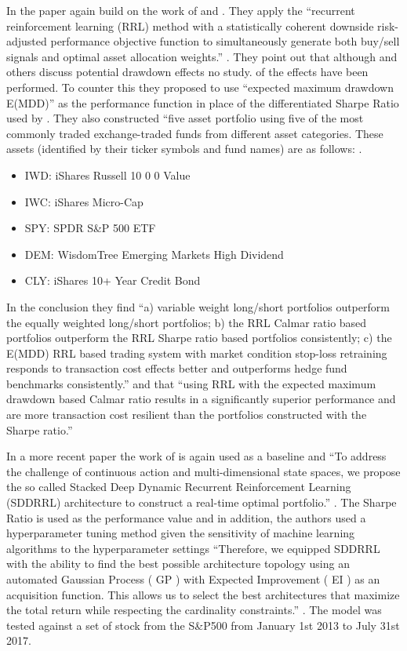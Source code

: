 \documentclass[oneside,12pt]{Classes/RoboticsLaTeX}
\begin{document}
\begin{itemize}
In the paper \citet{ALMAHDI2017267} again build on the work of \citet{MoodyJohn1998Pfar} and \citet{MoodyJ2001Lttv}. They apply the “recurrent reinforcement learning (RRL) method with a statistically coherent downside risk-adjusted performance objective function to simultaneously generate both buy/sell signals and optimal asset allocation weights.” \citep[p267]{ALMAHDI2017267}. They point out that although \citet{MoodyJohn1998Pfar} and others discuss potential drawdown effects no study. of the effects have been performed. To counter this they proposed to use “expected maximum drawdown E(MDD)” \citep[p267]{ALMAHDI2017267} as the performance function in place of the differentiated Sharpe Ratio used by \citet{MoodyJohn1998Pfar}.  They also constructed “five asset portfolio using five of the most commonly traded exchange-traded funds from different asset categories. These assets (identified by their ticker symbols and fund names) are as follows: \citep[p271]{ALMAHDI2017267}.
\begin{itemize}
\item IWD: iShares Russell 10 0 0 Value 
\item IWC: iShares Micro-Cap 
\item SPY: SPDR S&P 500 ETF 
\item DEM: WisdomTree Emerging Markets High Dividend 
\item CLY: iShares 10+ Year Credit Bond
\end{itemize}

 In the conclusion they find “a) variable weight long/short portfolios outperform the equally weighted long/short portfolios; b) the RRL Calmar ratio based portfolios outperform the RRL Sharpe ratio based portfolios consistently; c) the E(MDD) RRL based trading system with market condition stop-loss retraining responds to transaction cost effects better and outperforms hedge fund benchmarks consistently.” \citep[p279]{ALMAHDI2017267} and that “using RRL with the expected maximum drawdown based Calmar ratio results in a significantly superior performance and are more transaction cost resilient than the portfolios constructed with the Sharpe ratio.” \citep[p279]{ALMAHDI2017267}
 
In a more recent paper \citet{ABOUSSALAH2020112891} the work of \citet{MoodyJohn1998Pfar} is again used as a baseline and “To address the challenge of continuous action and multi-dimensional state spaces, we propose the so called Stacked Deep Dynamic Recurrent Reinforcement Learning (SDDRRL) architecture to construct a real-time optimal portfolio.” \citep[p1]{ABOUSSALAH2020112891}. The Sharpe Ratio is used as the performance value and in addition, the authors used a hyperparameter tuning method given the sensitivity of machine learning algorithms to the hyperparameter settings “Therefore, we equipped SDDRRL with the ability to find the best possible architecture topology using an automated Gaussian Process ( GP ) with Expected Improvement ( EI ) as an acquisition function. This allows us to select the best architectures that maximize the total return while respecting the cardinality constraints.” \citep[p1]{ABOUSSALAH2020112891}. The model was tested against a set of stock from the S\&P500 from January 1st 2013 to July 31st 2017.


\end{itemize}
\end{document}
